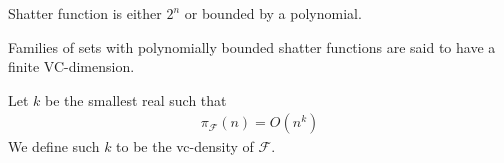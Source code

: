 \documentclass{amsart}
\newcommand{\F}{\mathcal F}
\begin{document}
\begin{Theorem} 
	Shatter function is either $2^n$ or bounded by a polynomial.
\end{Theorem}

\begin{Definition}
	Families of sets with polynomially bounded shatter functions are said to have a finite VC-dimension.
\end{Definition}

\begin{Definition}
	Let $k$ be the smallest real such that 
	\begin{align*}
		\pi_\F(n) = O(n^k)
	\end{align*}
	We define such $k$ to be the vc-density of $\F$.
\end{Definition}
\end{document}
